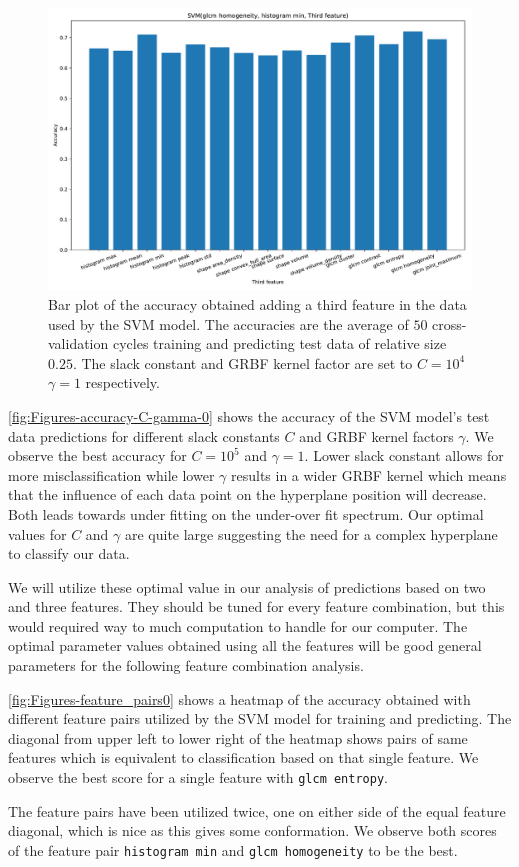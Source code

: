 \begin{figure}[H]
\centering
\includegraphics[width=1\textwidth]{Figures/third_feature4}
\caption{Bar plot of the accuracy obtained adding a third feature in the data used 
by the SVM model. The accuracies are the average 
of $50$ cross-validation cycles training and predicting test data of relative size $0.25$.
The slack constant and GRBF kernel factor are set to $C=10^4$  $\gamma=1 $ respectively. }
\label{fig:Figures-third_feature4}
\end{figure}



\autoref{fig:Figures-accuracy-C-gamma-0} shows the accuracy of the SVM model's 
test data predictions for different slack constants $C$ and GRBF kernel factors $\gamma $. 
We observe the best accuracy for $C=10^5$ and $\gamma =1$. Lower slack constant 
allows for more misclassification while lower $\gamma $ results in a wider 
GRBF kernel which means that the influence of each data point on the hyperplane 
position will decrease. Both leads towards under fitting on the under-over fit spectrum.
Our optimal values for $C$ and $\gamma $ are quite large suggesting the need for 
a complex hyperplane to classify our data. 

We will utilize these optimal value in our analysis of predictions based on two and three 
features. They should be tuned for every feature combination, but this would required 
way to much computation to handle for our computer. The optimal parameter values 
obtained using all the features will be good general parameters for the following 
feature combination analysis. 


\autoref{fig:Figures-feature_pairs0} shows a heatmap of the accuracy obtained with different 
feature pairs utilized by the SVM model for training and predicting. The diagonal from upper left 
to lower right of the heatmap shows pairs of same features which is equivalent to classification 
based on that single feature. We observe the best score for a single feature with \verb|glcm entropy|.

The feature pairs have been utilized twice, one on either side of the equal feature diagonal, which is nice as 
this gives some conformation. We observe both scores of the feature pair \verb|histogram min| and \verb|glcm homogeneity| 
to be the best. 

